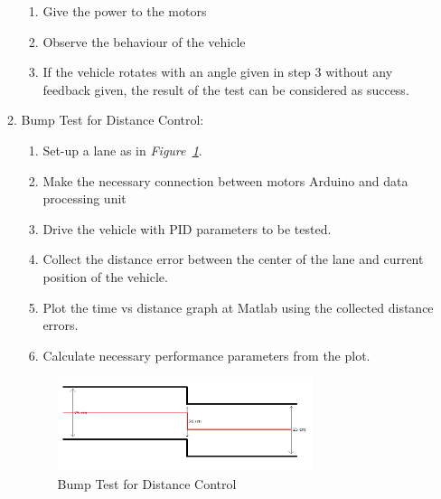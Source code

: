 \documentclass[a4paper,12pt]{article}
\begin{document}
\begin{enumerate}
\begin{enumerate}
\begin{enumerate}
\item Give the power to the motors  

\item Observe the behaviour of the vehicle  

\item If the vehicle rotates with an angle given in step 3 without any feedback given, the result of the test can be considered as success.  

\end{enumerate}


\item Bump Test for Distance Control: \label{test:b}	

\begin{enumerate}

\item Set-up a lane as in \textit{Figure~\ref{fig:bump-dist}}.

\item Make the necessary connection between motors Arduino and data processing unit  

\item Drive the vehicle with PID parameters to be tested.

\item Collect the distance error between the center of the lane and current position of the vehicle.

\item Plot the time vs distance graph at Matlab using the collected distance errors.

\item Calculate necessary performance parameters from the plot.


\end{enumerate}


\begin{figure}[h]

\includegraphics[width=0.75\textwidth,center]{images/bump_test_dist}

\caption{Bump Test for Distance Control \label{fig:bump-dist} }

\end{figure}		



\end{enumerate}
\end{enumerate}
\end{document}
